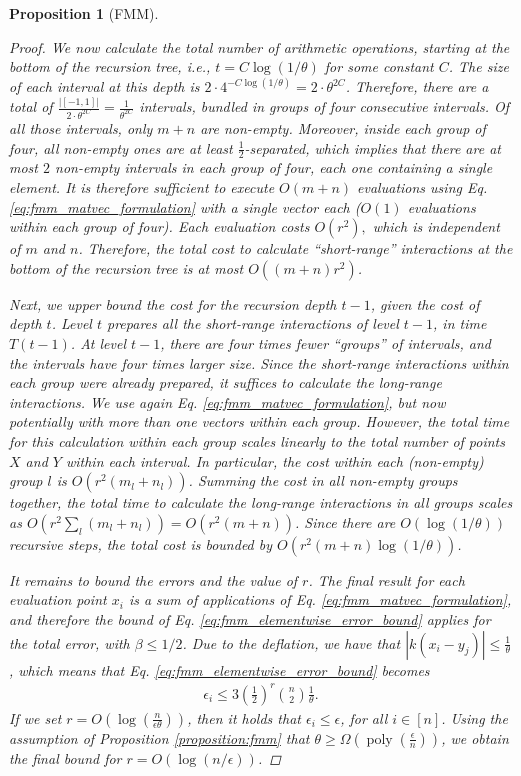 \documentclass{article}
\newcommand{\labs}{\left|}
\newcommand{\rabs}{\right|}
\newtheorem{proposition}{Proposition}[section]
\DeclareMathOperator{\poly}{poly}
\begin{document}
\begin{proposition}[FMM]
\begin{proof}
    We now calculate the total number of arithmetic operations, starting at the bottom of the recursion tree, i.e., $t=C\log(1/\theta)$ for some constant $C$. The size of each interval at this depth is $2\cdot4^{-C\log(1/\theta)}=2\cdot \theta^{2C}$. Therefore, there are a total of $\frac{\labs[-1,1]\rabs}{2\cdot \theta^{2C}}=\frac{1}{\theta^{2C}}$ intervals, bundled in groups of four consecutive intervals. Of all those intervals, only $m+n$ are non-empty. Moreover, inside each group of four, all non-empty ones are at least $\frac{1}{2}$-separated, which implies that there are at most $2$ non-empty intervals in each group of four, each one containing a single element. 
    It is therefore sufficient to execute $O(m+n)$ evaluations using Eq. \eqref{eq:fmm_matvec_formulation} with a single vector each ($O(1)$ evaluations within each group of four). Each evaluation costs $O(r^2),$ which is independent of $m$ and $n$. Therefore, the total cost to calculate ``short-range'' interactions at the bottom of the recursion tree is at most $O((m+n)r^2)$.

    Next, we upper bound the cost for the recursion depth $t-1$, given the cost of depth $t$. Level $t$ prepares all the short-range interactions of level $t-1$, in time $T(t-1)$. At level $t-1$, there are four times fewer ``groups'' of intervals, and the intervals have four times larger size. Since the short-range interactions within each group were already prepared, it suffices to calculate the long-range interactions. We use again Eq. \eqref{eq:fmm_matvec_formulation}, but now potentially with more than one vectors within each group. 
    However, the total time for this calculation within each group scales linearly to the total number of points $X$ and $Y$ \emph{within each interval}.
    In particular, the cost within each (non-empty) group $l$ is $O(r^2(m_l+n_l))$. Summing the cost in all non-empty groups together, the total time to calculate the long-range interactions in \emph{all} groups scales as $O(r^2\sum_l (m_l+n_l))=O(r^2(m+n))$. 
    Since there are $O(\log(1/\theta))$ recursive steps, the total cost is bounded by $O(r^2(m+n)\log(1/\theta))$.
    
    It remains to bound the errors and the value of $r$. The final result for each evaluation point $x_i$ is a sum of applications of Eq. \eqref{eq:fmm_matvec_formulation}, and therefore the bound of Eq. \eqref{eq:fmm_elementwise_error_bound} applies for the total error, with $\beta\leq 1/2$. Due to the deflation, we have that $|k(x_i-y_j)|\leq \frac{1}{\theta}$, which means that Eq.  \eqref{eq:fmm_elementwise_error_bound} becomes
    \begin{align*}
        \epsilon_i \leq 3\left(\frac{1}{2}\right)^r\binom{n}{2}\frac{1}{\theta}.    
    \end{align*}
    If we set $r=O(\log(\frac{n}{\epsilon\theta}))$, then it holds that $\epsilon_i\leq \epsilon$, for all $i\in[n]$.
    Using the assumption of Proposition \ref{proposition:fmm} that $\theta \geq \Omega(\poly(\tfrac{\epsilon}{n}))$, we obtain the final bound for $r=O(\log(n/\epsilon))$.


\end{proof}
\end{proposition}
\end{document}
